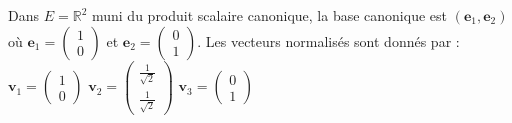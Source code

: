 \documentclass[11pt,a4paper]{report}
\begin{document}
Dans \(E = \mathbb{R}^2\) muni du produit scalaire canonique, la base
canonique est \((\mathbf{e}_1, \mathbf{e}_2)\) où
\(\mathbf{e}_1 = \begin{pmatrix} 1 \\ 0 \end{pmatrix}\) et
\(\mathbf{e}_2 = \begin{pmatrix} 0 \\ 1 \end{pmatrix}\). Les vecteurs
normalisés sont donnés par :
\(\mathbf{v}_1 = \begin{pmatrix} 1 \\ 0 \end{pmatrix}\)
\(\mathbf{v}_2 = \begin{pmatrix} \frac{1}{\sqrt{2}} \\ \frac{1}{\sqrt{2}} \end{pmatrix}\)
\(\mathbf{v}_3 = \begin{pmatrix} 0 \\ 1 \end{pmatrix}\)
\end{document}
